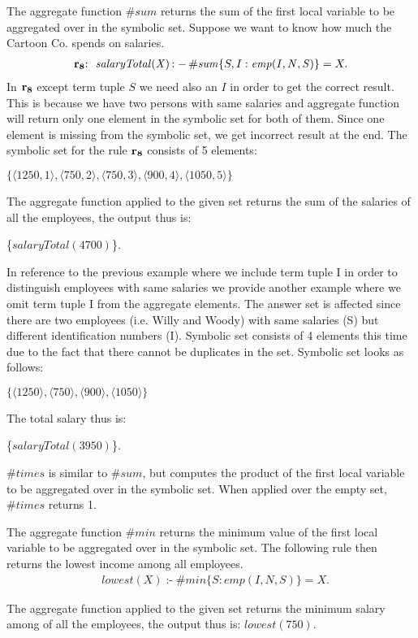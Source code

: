 \documentclass[a4paper, titlepage]{article}
\DeclareMathOperator{\leftimpl}{:-}
\newcommand\mycenterline[1]{\par\smallskip\centerline{#1} \smallskip}
\newcommand{\row}[1]{%
  \ensuremath{\color{black}\ensuremath{\mathbf{#1}} \color{black}}%
}
\newcommand{\rowprefix}[1]{%
  \ensuremath{\color{black}\mathbf{#1{:}}\ }%
}
\begin{document}
The aggregate function $\mathit{\#sum}$ returns the 
sum of the first local variable to be aggregated over in 
the symbolic set. Suppose we want to know how much the 
Cartoon Co. spends on salaries.
\begin{align*}
\mathit{\rowprefix{r_8} \ salaryTotal(X)} \leftimpl \mathit{\#sum}\{S,I : 
\mathit{emp(I,N,S)}\} = X.
\end{align*}
In $\row{r_8}$ except term tuple $S$ we need also an $I$ in order to get the correct result. This is because we have two persons with same salaries and aggregate function will return only one element in the symbolic set for both of them. Since one element is missing from the symbolic set, we get incorrect result at the end.  
The symbolic set for the rule $\row{r_8}$ consists of 5 elements: 
\mycenterline{$\{ \langle 1250,1 \rangle, \langle 750,2 \rangle, \langle 750,3 \rangle, \langle 900,4 \rangle, \langle 1050,5 \rangle\}$} 
The 
aggregate function applied to the given set returns the sum 
of the salaries of all the employees, the output thus is: 
\mycenterline{
\{$\mathit{salaryTotal(4700)}$\}.} 
In reference to the previous example where we include term tuple I in order to distinguish employees with same salaries we 
provide another example where we omit term tuple I  from the aggregate elements. The answer set is affected since
there are two employees (i.e. Willy and Woody) with same salaries (S) but different identification numbers (I).
Symbolic set consists of 4 elements this time due to the fact that there cannot be duplicates in the set. Symbolic set looks as follows:
\mycenterline{$\{ \langle 1250 \rangle, \langle 750 \rangle, \langle 900 \rangle,  \langle 1050 \rangle\}$}
The total salary thus is:
\mycenterline{
\{$\mathit{salaryTotal(3950)}$\}.} 
 
$\mathit{\#times}$ is 
similar to $\mathit{\#sum}$, but computes the product of 
the first local variable to be aggregated over in the 
symbolic set. When applied over the empty set, 
$\mathit{\#times}$ returns 1.

The aggregate function $\mathit{\#min}$ returns 
the minimum value of the first local variable to be 
aggregated over in the symbolic set. The following rule then returns the lowest income among all employees.
\begin{align*}
& lowest(X) \leftimpl \#min\{S : emp(I,N,S)\} = X.
\end{align*}

The aggregate function applied to the given set returns the 
minimum salary among of all the employees, the output thus 
is:
{$\mathit{lowest(750)}$}.
\end{document}
